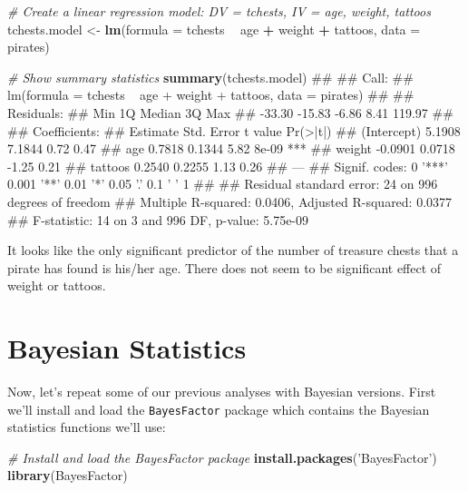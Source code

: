 \documentclass[]{book}
\newenvironment{Shaded}{\begin{snugshade}}{\end{snugshade}}
\newcommand{\KeywordTok}[1]{\textcolor[rgb]{0.13,0.29,0.53}{\textbf{#1}}}
\newcommand{\DataTypeTok}[1]{\textcolor[rgb]{0.13,0.29,0.53}{#1}}
\newcommand{\StringTok}[1]{\textcolor[rgb]{0.31,0.60,0.02}{#1}}
\newcommand{\CommentTok}[1]{\textcolor[rgb]{0.56,0.35,0.01}{\textit{#1}}}
\newcommand{\OperatorTok}[1]{\textcolor[rgb]{0.81,0.36,0.00}{\textbf{#1}}}
\newcommand{\NormalTok}[1]{#1}
\theoremstyle{definition}
\theoremstyle{definition}
\theoremstyle{remark}
\begin{document}
\begin{Shaded}
\begin{Highlighting}[]
\CommentTok{# Create a linear regression model: DV = tchests, IV = age, weight, tattoos}
\NormalTok{tchests.model <-}\StringTok{ }\KeywordTok{lm}\NormalTok{(}\DataTypeTok{formula =}\NormalTok{ tchests }\OperatorTok{~}\StringTok{ }\NormalTok{age }\OperatorTok{+}\StringTok{ }\NormalTok{weight }\OperatorTok{+}\StringTok{ }\NormalTok{tattoos,}
                    \DataTypeTok{data =}\NormalTok{ pirates)}

\CommentTok{# Show summary statistics}
\KeywordTok{summary}\NormalTok{(tchests.model)}
\NormalTok{## }
\NormalTok{## Call:}
\NormalTok{## lm(formula = tchests ~ age + weight + tattoos, data = pirates)}
\NormalTok{## }
\NormalTok{## Residuals:}
\NormalTok{##    Min     1Q Median     3Q    Max }
\NormalTok{## -33.30 -15.83  -6.86   8.41 119.97 }
\NormalTok{## }
\NormalTok{## Coefficients:}
\NormalTok{##             Estimate Std. Error t value Pr(>|t|)    }
\NormalTok{## (Intercept)   5.1908     7.1844    0.72     0.47    }
\NormalTok{## age           0.7818     0.1344    5.82    8e-09 ***}
\NormalTok{## weight       -0.0901     0.0718   -1.25     0.21    }
\NormalTok{## tattoos       0.2540     0.2255    1.13     0.26    }
\NormalTok{## ---}
\NormalTok{## Signif. codes:  0 '***' 0.001 '**' 0.01 '*' 0.05 '.' 0.1 ' ' 1}
\NormalTok{## }
\NormalTok{## Residual standard error: 24 on 996 degrees of freedom}
\NormalTok{## Multiple R-squared:  0.0406, Adjusted R-squared:  0.0377 }
\NormalTok{## F-statistic:   14 on 3 and 996 DF,  p-value: 5.75e-09}
\end{Highlighting}
\end{Shaded}

It looks like the only significant predictor of the number of treasure
chests that a pirate has found is his/her age. There does not seem to be
significant effect of weight or tattoos.

\section{Bayesian Statistics}\label{bayesian-statistics}

Now, let's repeat some of our previous analyses with Bayesian versions.
First we'll install and load the \texttt{BayesFactor} package which
contains the Bayesian statistics functions we'll use:

\begin{Shaded}
\begin{Highlighting}[]
\CommentTok{# Install and load the BayesFactor package}
\KeywordTok{install.packages}\NormalTok{(}\StringTok{'BayesFactor'}\NormalTok{)}
\KeywordTok{library}\NormalTok{(BayesFactor)}
\end{Highlighting}
\end{Shaded}
\end{document}
